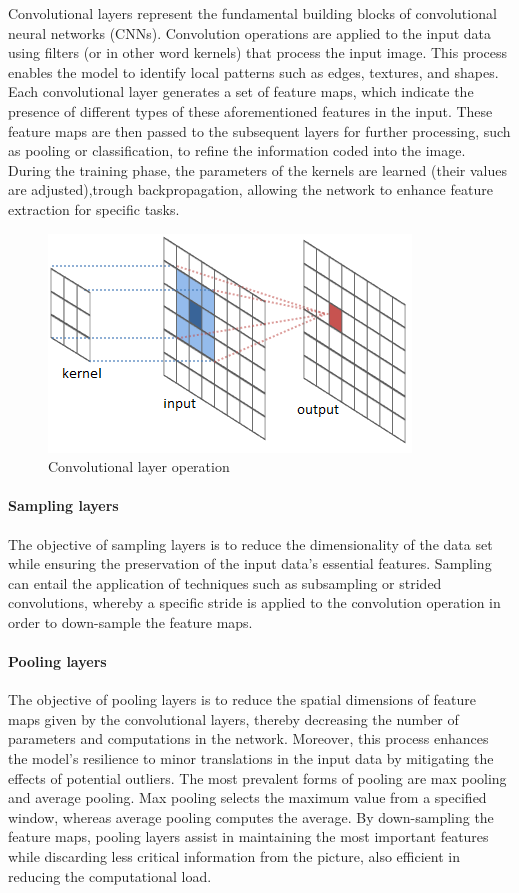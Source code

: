 Convolutional layers  represent the fundamental building blocks of convolutional neural networks (CNNs).
Convolution operations are applied to the input data using filters (or in other word kernels) that process the input image.
This process enables the model to identify local patterns such as  edges, textures, and shapes.
Each convolutional layer generates a set of feature maps,
which indicate the presence of different types of these aforementioned features in the input.
These feature maps are then passed to the subsequent layers for further processing, such as pooling or classification,
to refine the information coded into the image.
During the training phase, the parameters of the kernels are learned (their values are adjusted),trough backpropagation,
allowing the network to enhance feature extraction for specific tasks.


\begin{figure}[h]
\centering
\includegraphics[width=.50\textwidth]{figures/convolution}
\caption{Convolutional layer operation~\cite{article}}
\label{fig:convolution}
\end{figure}

\paragraph{Sampling layers}\label{par:sampling-layers}

The objective of sampling layers is to reduce the dimensionality of the data set while ensuring the preservation of the
input data's essential features.
Sampling can entail the application of techniques such as subsampling or strided convolutions,
whereby a specific stride is applied to the convolution operation in order to down-sample the feature maps.

\paragraph{Pooling layers}\label{par:pooling-layers}

The objective of pooling layers is to reduce the spatial dimensions of feature maps given by the convolutional layers,
thereby decreasing the number of parameters and computations in the network.
Moreover, this process enhances the model's resilience to minor
translations in the input data by mitigating the effects of potential outliers.
The most prevalent forms of pooling are max pooling and average pooling.
Max pooling selects the maximum value from a specified window, whereas average pooling computes the average.
By down-sampling the feature maps, pooling layers assist in maintaining the most important features while discarding less
critical information from the picture, also efficient in reducing the computational load.



